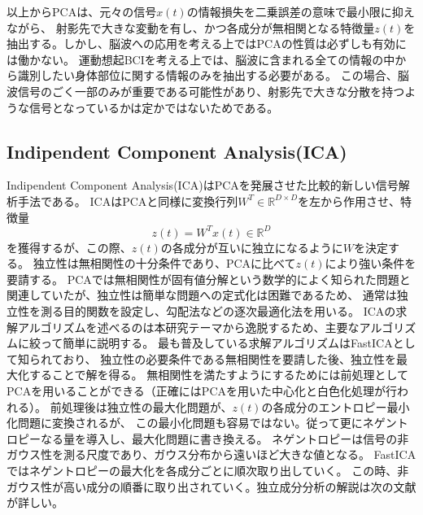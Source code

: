 以上からPCAは、元々の信号\(x(t)\)の情報損失を二乗誤差の意味で最小限に抑えながら、
射影先で大きな変動を有し、かつ各成分が無相関となる特徴量\(z(t)\)を抽出する。しかし、脳波への応用を考える上ではPCAの性質は必ずしも有効には働かない。
運動想起BCIを考える上では、脳波に含まれる全ての情報の中から識別したい身体部位に関する情報のみを抽出する必要がある。
この場合、脳波信号のごく一部のみが重要である可能性があり、射影先で大きな分散を持つような信号となっているかは定かではないためである。




\subsection{Indipendent Component Analysis(ICA)}
Indipendent Component Analysis(ICA)はPCAを発展させた比較的新しい信号解析手法である。
ICAはPCAと同様に変換行列\(W^T \in \mathbb R^{D \times D}\)を左から作用させ、特徴量
\begin{equation}
    z(t)=W^Tx(t) \in \mathbb R^D
\end{equation}
を獲得するが、この際、\(z(t)\)の各成分が互いに独立になるように\(W\)を決定する。
独立性は無相関性の十分条件であり、PCAに比べて\(z(t)\)により強い条件を要請する。
PCAでは無相関性が固有値分解という数学的によく知られた問題と関連していたが、独立性は簡単な問題への定式化は困難であるため、
通常は独立性を測る目的関数を設定し、勾配法などの逐次最適化法を用いる。
ICAの求解アルゴリズムを述べるのは本研究テーマから逸脱するため、主要なアルゴリズムに絞って簡単に説明する。
最も普及している求解アルゴリズムはFastICAとして知られており、
独立性の必要条件である無相関性を要請した後、独立性を最大化することで解を得る。
無相関性を満たすようにするためには前処理としてPCAを用いることができる（正確にはPCAを用いた中心化と白色化処理が行われる）。
前処理後は独立性の最大化問題が、\(z(t)\)の各成分のエントロピー最小化問題に変換されるが、
この最小化問題も容易ではない。従って更にネゲントロピーなる量を導入し、最大化問題に書き換える。
ネゲントロピーは信号の非ガウス性を測る尺度であり、ガウス分布から遠いほど大きな値となる。
FastICAではネゲントロピーの最大化を各成分ごとに順次取り出していく。
この時、非ガウス性が高い成分の順番に取り出されていく。独立成分分析の解説は次の文献が詳しい\cite{ICA1}\cite{ICA2}。

